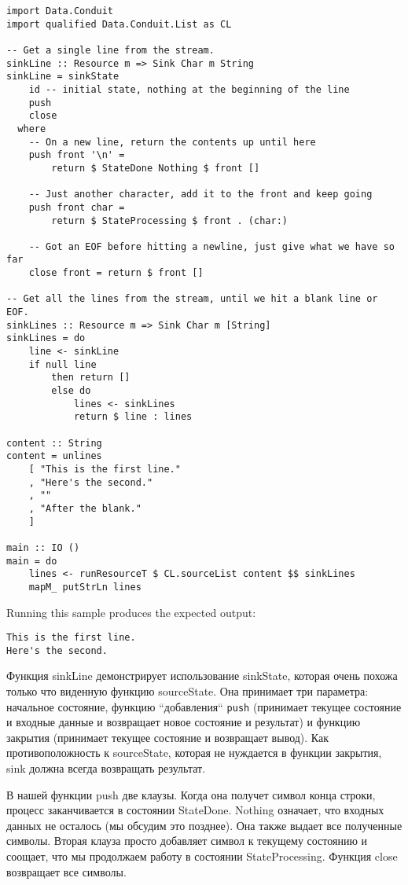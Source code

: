 \begin{lstlisting}
import Data.Conduit
import qualified Data.Conduit.List as CL

-- Get a single line from the stream.
sinkLine :: Resource m => Sink Char m String
sinkLine = sinkState
    id -- initial state, nothing at the beginning of the line
    push
    close
  where
    -- On a new line, return the contents up until here
    push front '\n' =
        return $ StateDone Nothing $ front []

    -- Just another character, add it to the front and keep going
    push front char =
        return $ StateProcessing $ front . (char:)

    -- Got an EOF before hitting a newline, just give what we have so far
    close front = return $ front []

-- Get all the lines from the stream, until we hit a blank line or EOF.
sinkLines :: Resource m => Sink Char m [String]
sinkLines = do
    line <- sinkLine
    if null line
        then return []
        else do
            lines <- sinkLines
            return $ line : lines

content :: String
content = unlines
    [ "This is the first line."
    , "Here's the second."
    , ""
    , "After the blank."
    ]

main :: IO ()
main = do
    lines <- runResourceT $ CL.sourceList content $$ sinkLines
    mapM_ putStrLn lines
\end{lstlisting}
Running this sample produces the expected output:
\begin{verbatim}
This is the first line.
Here's the second.
\end{verbatim}
 
 
Функция sinkLine демонстрирует использование sinkState, которая очень похожа только что
виденную функцию sourceState. Она принимает три параметра: начальное состояние,
функцию ``добавления`` \verb=push= 
(принимает текущее состояние и входные данные и возвращает новое состояние и результат)
и функцию закрытия (принимает текущее состояние и возвращает вывод). Как
противоположность к sourceState, которая не нуждается в функции закрытия, sink должна
всегда возвращать результат.

В нашей функции push две клаузы. Когда она получет символ конца строки, процесс
заканчивается в состоянии StateDone. Nothing означает, что входных данных не
осталось (мы обсудим это позднее). Она также выдает все полученные символы. Вторая
клауза просто добавляет символ к текущему состоянию и соощает, что мы продолжаем работу
в состоянии StateProcessing. Функция close возвращает все символы.

